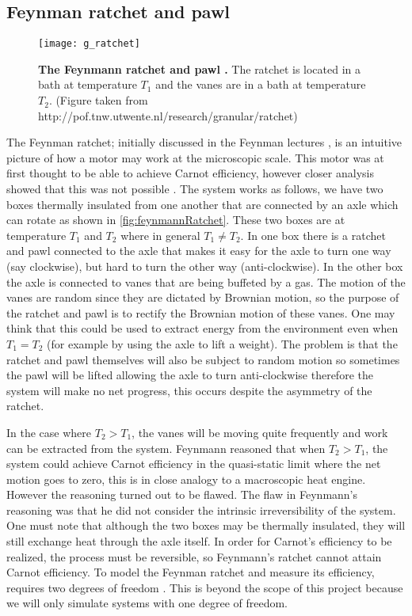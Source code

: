 \subsection{Feynman ratchet and pawl}
\begin{figure}
	\center
	\texttt{[image: g\_ratchet]}
	\caption{\textbf{The Feynmann ratchet and pawl \cite{Feynman1963}.} The ratchet is located in a bath at temperature $T_1$ and the vanes are in a bath at temperature $T_2$.  (Figure taken from http://pof.tnw.utwente.nl/research/granular/ratchet) \label{fig:feynmannRatchet}}
\end{figure}
The Feynman ratchet; initially discussed in the Feynman lectures \cite{Feynman1963}, is an intuitive picture of how a motor may work at the microscopic scale. This motor was at first thought to be able to achieve Carnot efficiency, however closer analysis showed that this was not possible \cite{ParrondoEspanol1996}. The system works as follows, we have two boxes thermally insulated from one another that are connected by an axle which can rotate as shown in \autoref{fig:feynmannRatchet}. These two boxes are at temperature $T_1$ and $T_2$ where in general $T_1 \neq T_2$. In one box there is a ratchet and pawl connected to the axle that makes it easy for the axle to turn one way (say clockwise), but hard to turn the other way (anti-clockwise). In the other box the axle is connected to vanes that are being buffeted by a gas. The motion of the vanes are random since they are dictated by Brownian motion, so the purpose of the ratchet and pawl is to rectify the Brownian motion of these vanes. One may think that this could be used to extract energy from the environment even when $T_1 = T_2$ (for example by using the axle to lift a weight). The problem is that the ratchet and pawl themselves will also be subject to random motion so sometimes the pawl will be lifted allowing the axle to turn anti-clockwise therefore the system will make no net progress, this occurs despite the asymmetry of the ratchet.

In the case where $T_2 > T_1$, the vanes will be moving quite frequently and work can be extracted from the system. Feynmann reasoned that when $T_2 > T_1$, the system could achieve Carnot efficiency in the quasi-static limit where the net motion goes to zero, this is in close analogy to a macroscopic heat engine. However the reasoning turned out to be flawed. The flaw in Feynmann's reasoning  was that he did not consider the intrinsic irreversibility of the system. One must note that although the two boxes may be thermally insulated, they will still exchange heat through the axle itself. In order for Carnot's efficiency to be realized, the process must be reversible, so Feynmann's ratchet cannot attain Carnot efficiency. To model the Feynman ratchet and measure its efficiency, requires two degrees of freedom \cite{M.W.Jack2016}. This is beyond the scope of this project because we will only simulate systems with one degree of freedom.

